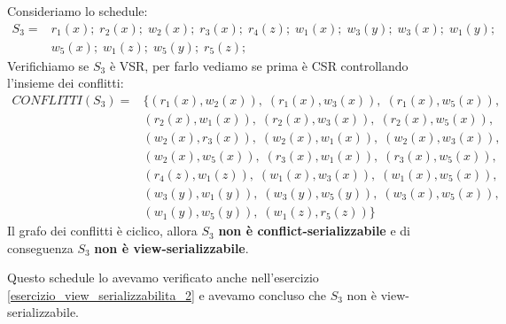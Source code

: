 \documentclass[a4paper]{article}
\begin{document}
\begin{example}
  Consideriamo lo schedule:
  \[
    \begin{aligned}
      S_3 =& r_1(x); \; r_2(x); \; w_2(x); \; r_3(x); \; r_4(z); \; w_1(x); \; w_3(y); \;
      w_3(x); \; w_1(y);\\
           &w_5(x); \; w_1(z); \; w_5(y); \; r_5(z);
    \end{aligned}
  \] 
  Verifichiamo se \( S_3 \) è VSR, per farlo vediamo se prima è CSR controllando
  l'insieme dei conflitti:
  \[
    \begin{aligned}
      CONFLITTI(S_3) =& \{
        (r_1(x), w_2(x)),\;
        (r_1(x), w_3(x)),\;
        (r_1(x), w_5(x)), \\
                      &(r_2(x), w_1(x)),\;
        (r_2(x), w_3(x)),\;
        (r_2(x), w_5(x)), \\
                      &(w_2(x), r_3(x)),\;
        (w_2(x), w_1(x)),\;
        (w_2(x), w_3(x)), \\
                      &(w_2(x), w_5(x)),\;
        (r_3(x), w_1(x)),\;
        (r_3(x), w_5(x)), \\
                      &(r_4(z), w_1(z)),\;
        (w_1(x), w_3(x)),\;
        (w_1(x), w_5(x)), \\
                      &(w_3(y), w_1(y)),\;
        (w_3(y), w_5(y)),\;
        (w_3(x), w_5(x)), \\
                      &(w_1(y), w_5(y)),\;
        (w_1(z), r_5(z))
      \} 
    \end{aligned}
  \] 
  Il grafo dei conflitti è ciclico, allora \( S_3 \) \textbf{non è conflict-serializzabile} e di
  conseguenza \( S_3 \) \textbf{non è view-serializzabile}.

  \vspace{1em}
  \noindent
  Questo schedule lo avevamo verificato anche nell'esercizio
  \ref{esercizio_view_serializzabilita_2} e avevamo concluso che \( S_3 \) non è
  view-serializzabile.
\end{example}
\end{document}
